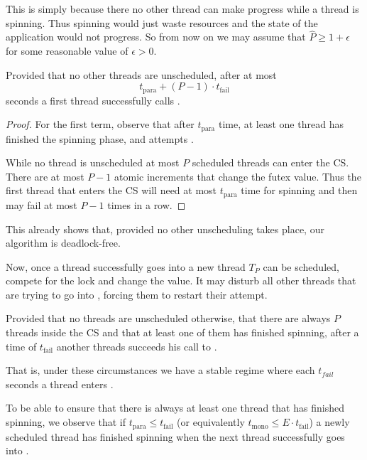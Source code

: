 This is simply because there no other thread can make progress
while a thread is spinning. Thus spinning would just waste
resources and the state of the application would not progress.  So
from now on we may assume that $\widehat{P} \geq 1+\epsilon$ for some
reasonable value of $\epsilon > 0$.
\fi

\begin{lemma}
Provided that no other threads are unscheduled, after at most
$$t_{\textrm{para}} + (P-1)\cdot t_{\textrm{fail}}$$
seconds a first thread successfully calls .
\end{lemma}

\begin{proof}
For the first term, observe that after $t_{\textrm{para}}$ time,
at least one thread has finished the spinning phase, and attempts
.

While no thread is unscheduled at most $P$ scheduled threads can
enter the CS. There are at most $P-1$ atomic
increments that change the futex value. Thus the first thread that
enters the CS will need at most $t_{\textrm{para}}$
time for spinning and then  may fail at most $P-1$
times in a row.
\end{proof}

\iflong
This already shows that, provided no other unscheduling takes
place, our algorithm is deadlock-free.

Now, once a thread successfully goes into  a new
thread $T_P$ can be scheduled, compete for the lock and change the
 value. It may disturb all other threads that are trying to
go into , forcing them to restart their attempt.

\begin{remark}
Provided that no threads are unscheduled otherwise, that there are
always $P$ threads inside the CS and that at least one of them has
finished spinning, after a time of $t_{\textrm{fail}}$ another
threads succeeds his call to .
\end{remark}

That is, under these circumstances we have a stable regime where each
$t_{fail}$ seconds a thread enters .

To be able to ensure that there is always at least one thread that
has finished spinning, we observe that if $t_{\textrm{para}} \leq
    t_{\textrm{fail}}$ (or equivalently $t_{\textrm{mono}} \leq E\cdot
    t_{\textrm{fail}}$) a newly scheduled thread has finished spinning
when the next thread successfully goes into .

